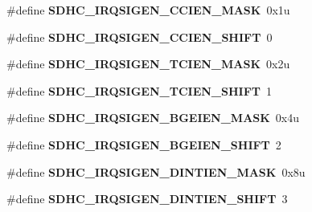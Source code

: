 \begin{DoxyCompactItemize}
\item 
\#define {\bfseries S\+D\+H\+C\+\_\+\+I\+R\+Q\+S\+I\+G\+E\+N\+\_\+\+C\+C\+I\+E\+N\+\_\+\+M\+A\+SK}~0x1u\hypertarget{group__SDHC__Register__Masks_ga393b56f0275bd461a60df5d1dad40370}{}\label{group__SDHC__Register__Masks_ga393b56f0275bd461a60df5d1dad40370}

\item 
\#define {\bfseries S\+D\+H\+C\+\_\+\+I\+R\+Q\+S\+I\+G\+E\+N\+\_\+\+C\+C\+I\+E\+N\+\_\+\+S\+H\+I\+FT}~0\hypertarget{group__SDHC__Register__Masks_ga7eed6122d048bd5f722d250817adcc96}{}\label{group__SDHC__Register__Masks_ga7eed6122d048bd5f722d250817adcc96}

\item 
\#define {\bfseries S\+D\+H\+C\+\_\+\+I\+R\+Q\+S\+I\+G\+E\+N\+\_\+\+T\+C\+I\+E\+N\+\_\+\+M\+A\+SK}~0x2u\hypertarget{group__SDHC__Register__Masks_ga18f4e41f80857c3a86c3ee99dad7fef0}{}\label{group__SDHC__Register__Masks_ga18f4e41f80857c3a86c3ee99dad7fef0}

\item 
\#define {\bfseries S\+D\+H\+C\+\_\+\+I\+R\+Q\+S\+I\+G\+E\+N\+\_\+\+T\+C\+I\+E\+N\+\_\+\+S\+H\+I\+FT}~1\hypertarget{group__SDHC__Register__Masks_ga6725fe5d247936a430d035b3860ae9f9}{}\label{group__SDHC__Register__Masks_ga6725fe5d247936a430d035b3860ae9f9}

\item 
\#define {\bfseries S\+D\+H\+C\+\_\+\+I\+R\+Q\+S\+I\+G\+E\+N\+\_\+\+B\+G\+E\+I\+E\+N\+\_\+\+M\+A\+SK}~0x4u\hypertarget{group__SDHC__Register__Masks_ga56ccc2a22e90f8d92cf3a7ad63791861}{}\label{group__SDHC__Register__Masks_ga56ccc2a22e90f8d92cf3a7ad63791861}

\item 
\#define {\bfseries S\+D\+H\+C\+\_\+\+I\+R\+Q\+S\+I\+G\+E\+N\+\_\+\+B\+G\+E\+I\+E\+N\+\_\+\+S\+H\+I\+FT}~2\hypertarget{group__SDHC__Register__Masks_ga4a14bf5315dcb669dc529920384cdf97}{}\label{group__SDHC__Register__Masks_ga4a14bf5315dcb669dc529920384cdf97}

\item 
\#define {\bfseries S\+D\+H\+C\+\_\+\+I\+R\+Q\+S\+I\+G\+E\+N\+\_\+\+D\+I\+N\+T\+I\+E\+N\+\_\+\+M\+A\+SK}~0x8u\hypertarget{group__SDHC__Register__Masks_ga9414ef10609a933fd60a109700f44498}{}\label{group__SDHC__Register__Masks_ga9414ef10609a933fd60a109700f44498}

\item 
\#define {\bfseries S\+D\+H\+C\+\_\+\+I\+R\+Q\+S\+I\+G\+E\+N\+\_\+\+D\+I\+N\+T\+I\+E\+N\+\_\+\+S\+H\+I\+FT}~3\hypertarget{group__SDHC__Register__Masks_gaafe7e328f182b268af1b86b90f8430c8}{}\label{group__SDHC__Register__Masks_gaafe7e328f182b268af1b86b90f8430c8}


\end{DoxyCompactItemize}
